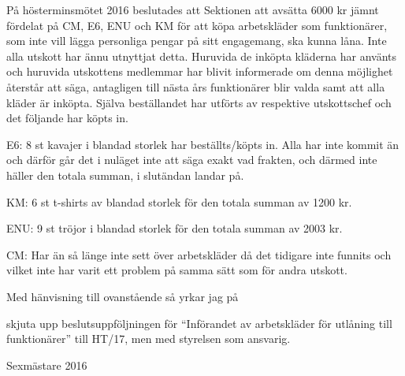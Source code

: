 \documentclass[../_main/handlingar.tex]{subfiles}
\begin{document}

På hösterminsmötet 2016 beslutades att Sektionen att avsätta 6000 kr jämnt fördelat på CM, E6, ENU och KM för att köpa arbetskläder som funktionärer, som inte vill lägga personliga pengar på sitt engagemang, ska kunna låna. Inte alla utskott har ännu utnyttjat detta. Huruvida de inköpta kläderna har använts och huruvida utskottens medlemmar har blivit informerade om denna möjlighet återstår att säga, antagligen till nästa års funktionärer blir valda samt att alla kläder är inköpta.  Själva beställandet har utförts av respektive utskottschef och det följande har köpts in.

\begin{dashlist}
    \item E6: 8 st kavajer i blandad storlek har beställts/köpts in. Alla har inte kommit än och därför går det i nuläget inte att säga exakt vad frakten, och därmed inte häller den totala summan, i slutändan landar på.
    \item KM: 6 st t-shirts av blandad storlek för den totala summan av 1200 kr.
    \item ENU: 9 st tröjor i blandad storlek för den totala summan av 2003 kr.
    \item CM: Har än så länge inte sett över arbetskläder då det tidigare inte funnits och vilket inte har varit ett problem på samma sätt som för andra utskott.
\end{dashlist}

Med hänvisning till ovanstående så yrkar jag på

\begin{attsatser}
    \att skjuta upp beslutsuppföljningen för ``Införandet av arbetskläder för utlåning till funktionärer'' till HT/17, men med styrelsen som ansvarig.
\end{attsatser}

\begin{signatures}{1}
    \mvh
    \signature{Martin Gemborn Nilsson}{Sexmästare 2016}
\end{signatures}
\end{document}
